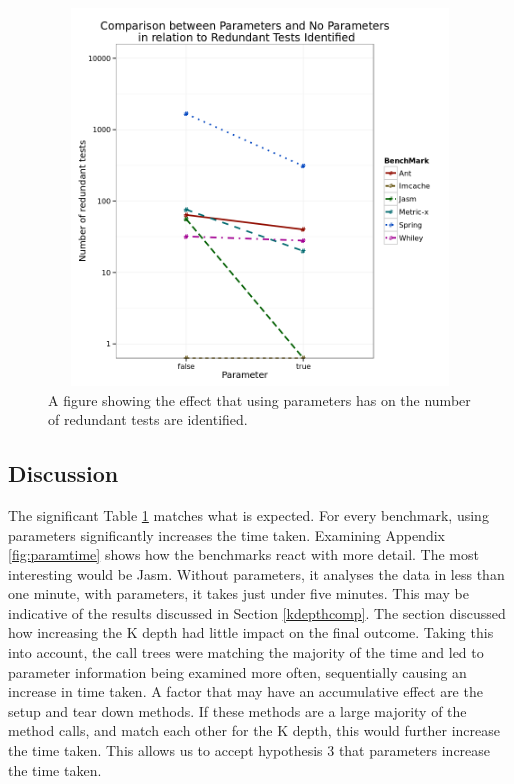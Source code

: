\begin{figure}[h]
\begin{center}
\includegraphics[height=10cm, width = 14.5cm]{Parameters.png}
\end{center}
\caption{A figure showing the effect that using parameters has on the number of redundant tests are identified.}
\label{fig:paramgraph}
\end{figure}


\subsection{Discussion}
The significant Table \ref{fig:paramgraph} matches what is expected. For every benchmark, using parameters significantly increases the time taken. Examining Appendix \ref{fig:paramtime} shows how the benchmarks react with more detail. The most interesting would be Jasm. Without parameters, it analyses the data in less than one minute, with parameters, it takes just under five minutes. This may be indicative of the results discussed in Section \ref{kdepthcomp}. The section discussed how increasing the K depth had little impact on the final outcome. Taking this into account, the call trees were matching the majority of the time and led to parameter information being examined more often, sequentially causing an increase in time taken. A factor that may have an accumulative effect are the setup and tear down methods. If these methods are a large majority of the method calls, and match each other for the K depth, this would further increase the time taken. This allows us to accept hypothesis 3 that parameters increase the time taken.

